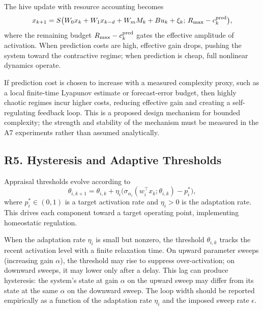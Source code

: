 \begin{definition}
The hive update with resource accounting becomes
\[
  x_{k+1}=S\bigl(W_0x_k+W_1x_{k-d}+W_mM_k+B u_k+\xi_k;\,R_{\max}-c_k^{\rm pred}\bigr),
\]
where the remaining budget $R_{\max}-c_k^{\rm pred}$ gates the effective
amplitude of activation.  When prediction costs are high, effective gain drops,
pushing the system toward the contractive regime; when prediction is cheap,
full nonlinear dynamics operate.
\end{definition}

\begin{designprinciple}
If prediction cost is chosen to increase with a measured complexity proxy, such
as a local finite-time Lyapunov estimate or forecast-error budget, then highly
chaotic regimes incur higher costs, reducing effective gain and creating a
self-regulating feedback loop.  This is a proposed design mechanism for bounded
complexity; the strength and stability of the mechanism must be measured in the
A7 experiments rather than assumed analytically.
\end{designprinciple}

\subsection*{R5. Hysteresis and Adaptive Thresholds}

\begin{definition}
Appraisal thresholds evolve according to
\[
  \theta_{i,k+1}=\theta_{i,k}+\eta_i\bigl(\sigma_{\alpha_i}(w_i^\top x_k;\theta_{i,k})-p_i^{\ast}\bigr),
\]
where $p_i^{\ast}\in(0,1)$ is a target activation rate and $\eta_i>0$ is the
adaptation rate.  This drives each component toward a target operating point,
implementing homeostatic regulation.
\end{definition}

\begin{hypothesis}
When the adaptation rate $\eta_i$ is small but nonzero, the threshold
$\theta_{i,k}$ tracks the recent activation level with a finite relaxation time.
On upward parameter sweeps (increasing gain $\alpha$), the threshold may rise to
suppress over-activation; on downward sweeps, it may lower only after a delay.
This lag can produce hysteresis: the system's state at gain $\alpha$ on the
upward sweep may differ from its state at the same $\alpha$ on the downward
sweep.  The loop width should be reported empirically as a function of the
adaptation rate $\eta_i$ and the imposed sweep rate $\epsilon$.
\end{hypothesis}

